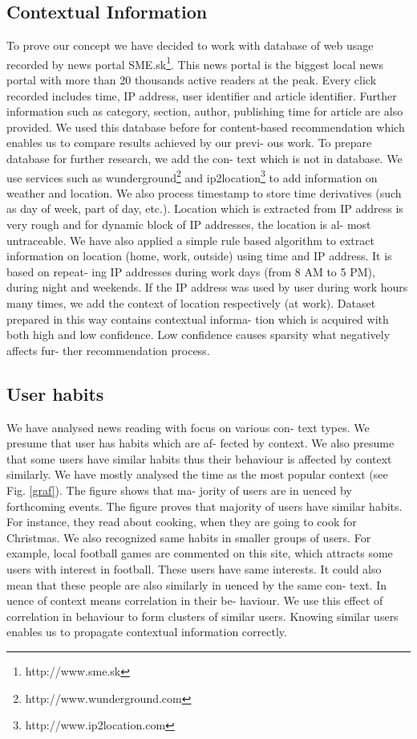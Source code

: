 \documentclass{acm_proc_article-sp}
\begin{document}
\subsection{Contextual Information}
To prove our concept we have decided to work with database
of web usage recorded by news portal SME.sk\footnote{http://www.sme.sk}. This news
portal is the biggest local news portal with more than 20
thousands active readers at the peak. Every click recorded
includes time, IP address, user identifier and article identifier. Further information such as category, section, author, publishing time for article are also provided. We used
this database before for content-based recommendation
which enables us to compare results achieved by our previ-
ous work.
To prepare database for further research, we add the con-
text which is not in database. We use services such as
wunderground\footnote{http://www.wunderground.com} and ip2location\footnote{http://www.ip2location.com} to add information on
weather and location. We also process timestamp to store
time derivatives (such as day of week, part of day, etc.).
Location which is extracted from IP address is very rough
and for dynamic block of IP addresses, the location is al-
most untraceable. We have also applied a simple rule based
algorithm to extract information on location (home, work,
outside) using time and IP address. It is based on repeat-
ing IP addresses during work days (from 8 AM to 5 PM),
during night and weekends. If the IP address was used by
user during work hours many times, we add the context of
location respectively (at work).
Dataset prepared in this way contains contextual informa-
tion which is acquired with both high and low confidence.
Low confidence causes sparsity what negatively affects fur-
ther recommendation process.

\subsection{User habits}
We have analysed news reading with focus on various con-
text types. We presume that user has habits which are af-
fected by context. We also presume that some users have
similar habits thus their behaviour is affected by context
similarly. We have mostly analysed the time as the most
popular context (see Fig. \ref{graf}). The figure shows that ma-
jority of users are in
uenced by forthcoming events. The
figure proves that majority of users have similar habits. For
instance, they read about cooking, when they are going to
cook for Christmas.
We also recognized same habits in smaller groups of users.
For example, local football games are commented on this
site, which attracts some users with interest in football.
These users have same interests. It could also mean that
these people are also similarly in
uenced by the same con-
text. In
uence of context means correlation in their be-
haviour. We use this effect of correlation in behaviour to
form clusters of similar users. Knowing similar users enables
us to propagate contextual information correctly.
\end{document}
